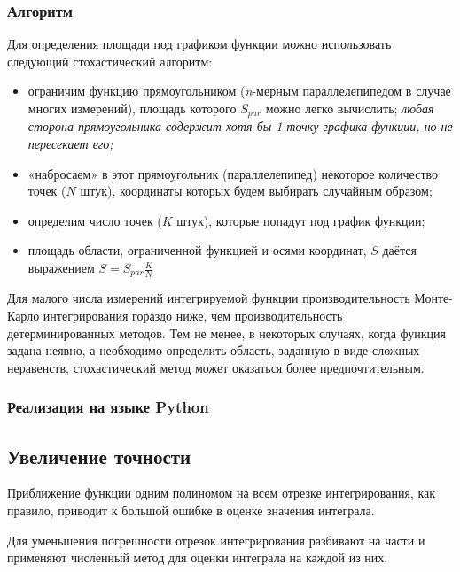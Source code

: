 \documentclass[a4paper]{article}
\begin{document}
{{{{{{{{\subsubsection{Алгоритм}

Для определения площади под графиком функции можно использовать
следующий стохастический алгоритм:

\begin{itemize}
\item
  ограничим функцию прямоугольником (\emph{n}-мерным параллелепипедом в
  случае многих измерений), площадь которого {{\(S_{par}\)}} можно легко
  вычислить; \emph{любая сторона прямоугольника содержит хотя бы 1 точку
  графика функции, но не пересекает его;}
\item
  «набросаем» в этот прямоугольник (параллелепипед) некоторое количество
  точек ({{\(N\)}} штук), координаты которых будем выбирать случайным
  образом;
\item
  определим число точек ({{\(K\)}} штук), которые попадут под график
  функции;
\item
  площадь области, ограниченной функцией и осями координат, {{\(S\)}}
  даётся выражением {{\(S = S_{par}\frac{K}{N}\)}}
\end{itemize}

Для малого числа измерений интегрируемой функции производительность
Монте-Карло интегрирования гораздо ниже, чем производительность
детерминированных методов. Тем не менее, в некоторых случаях, когда
функция задана неявно, а необходимо определить область, заданную в виде
сложных неравенств, стохастический метод может оказаться более
предпочтительным.

\subsubsection{Реализация на языке Python}



\subsection{Увеличение точности}

Приближение функции одним полиномом на всем отрезке интегрирования, как правило, приводит к большой ошибке в оценке значения интеграла.

Для уменьшения погрешности отрезок интегрирования разбивают на части и применяют численный метод для оценки интеграла на каждой из них.

}}}}}}}}
\end{document}
